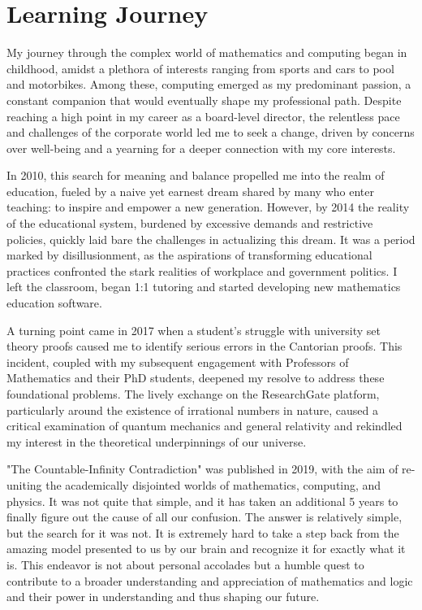 \documentclass[12pt]{article}
\begin{document}
\section*{Learning Journey}

My journey through the complex world of mathematics and computing began in childhood, amidst a plethora of interests ranging from sports and cars to pool and motorbikes. Among these, computing emerged as my predominant passion, a constant companion that would eventually shape my professional path. Despite reaching a high point in my career as a board-level director, the relentless pace and challenges of the corporate world led me to seek a change, driven by concerns over well-being and a yearning for a deeper connection with my core interests.

In 2010, this search for meaning and balance propelled me into the realm of education, fueled by a naive yet earnest dream shared by many who enter teaching: to inspire and empower a new generation. However, by 2014 the reality of the educational system, burdened by excessive demands and restrictive policies, quickly laid bare the challenges in actualizing this dream. It was a period marked by disillusionment, as the aspirations of transforming educational practices confronted the stark realities of workplace and government politics. I left the classroom, began 1:1 tutoring and started developing new mathematics education software.

A turning point came in 2017 when a student's struggle with university set theory proofs caused me to identify serious errors in the Cantorian proofs. This incident, coupled with my subsequent engagement with Professors of Mathematics and their PhD students, deepened my resolve to address these foundational problems. The lively exchange on the ResearchGate platform, particularly around the existence of irrational numbers in nature, caused a critical examination of quantum mechanics and general relativity and rekindled my interest in the theoretical underpinnings of our universe.

"The Countable-Infinity Contradiction" was published in 2019, with the aim of re-uniting the academically disjointed worlds of mathematics, computing, and physics. It was not quite that simple, and it has taken an additional 5 years to finally figure out the cause of all our confusion. The answer is relatively simple, but the search for it was not. It is extremely hard to take a step back from the amazing model presented to us by our brain and recognize it for exactly what it is. This endeavor is not about personal accolades but a humble quest to contribute to a broader understanding and appreciation of mathematics and logic and their power in understanding and thus shaping our future.
\end{document}
